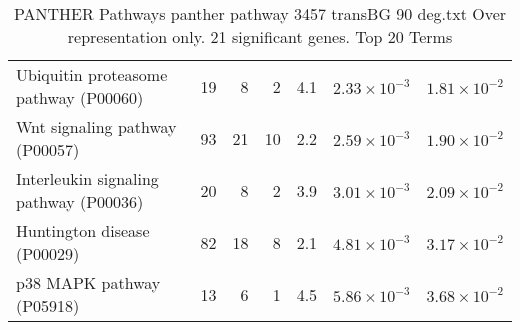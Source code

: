 \begin{table}[ht]
\begin{adjustbox}{width=\textwidth}
\begin{tabular}{lrrrrrr}
  Ubiquitin proteasome pathway (P00060) & 19 & 8 & 2 & 4.1 & $2.33 \times 10^{-3}$ & $1.81 \times 10^{-2}$ \\ 
  Wnt signaling pathway (P00057) & 93 & 21 & 10 & 2.2 & $2.59 \times 10^{-3}$ & $1.90 \times 10^{-2}$ \\ 
  Interleukin signaling pathway (P00036) & 20 & 8 & 2 & 3.9 & $3.01 \times 10^{-3}$ & $2.09 \times 10^{-2}$ \\ 
  Huntington disease (P00029) & 82 & 18 & 8 & 2.1 & $4.81 \times 10^{-3}$ & $3.17 \times 10^{-2}$ \\ 
  p38 MAPK pathway (P05918) & 13 & 6 & 1 & 4.5 & $5.86 \times 10^{-3}$ & $3.68 \times 10^{-2}$ \\ 
   \hline
\end{tabular}
\end{adjustbox}
\caption{PANTHER Pathways panther pathway 3457 transBG 90 deg.txt Over representation only. 21 significant genes. Top 20 Terms} 
\label{tab:PANTHER Pathways panther pathway 3457 transBG 90 deg.txt Over representation only. 21 significant genes. Top 20 Terms}
\end{table}



